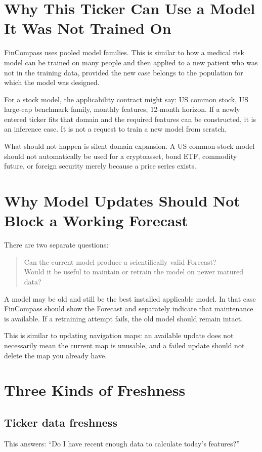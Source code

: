 \documentclass[11pt]{article}
\begin{document}
\section{Why This Ticker Can Use a Model It Was Not Trained On}
FinCompass uses pooled model families. This is similar to how a medical risk model can be trained on many people and then applied to a new patient who was not in the training data, provided the new case belongs to the population for which the model was designed.

For a stock model, the applicability contract might say: US common stock, US large-cap benchmark family, monthly features, 12-month horizon. If a newly entered ticker fits that domain and the required features can be constructed, it is an inference case. It is not a request to train a new model from scratch.

What should not happen is silent domain expansion. A US common-stock model should not automatically be used for a cryptoasset, bond ETF, commodity future, or foreign security merely because a price series exists.

\section{Why Model Updates Should Not Block a Working Forecast}
There are two separate questions:
\begin{quote}
Can the current model produce a scientifically valid Forecast?\\
Would it be useful to maintain or retrain the model on newer matured data?
\end{quote}
A model may be old and still be the best installed applicable model. In that case FinCompass should show the Forecast and separately indicate that maintenance is available. If a retraining attempt fails, the old model should remain intact.

This is similar to updating navigation maps: an available update does not necessarily mean the current map is unusable, and a failed update should not delete the map you already have.

\section{Three Kinds of Freshness}
\subsection{Ticker data freshness}
This answers: ``Do I have recent enough data to calculate today's features?''
\end{document}
